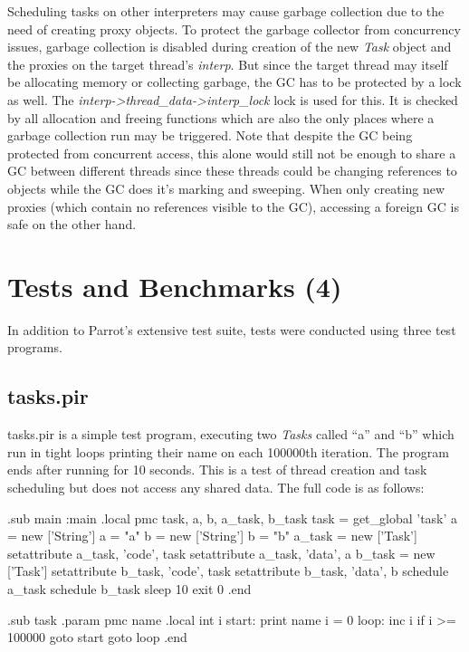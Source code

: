 \documentclass[bachelor,english]{hgbthesis}
\begin{document}
Scheduling tasks on other interpreters may cause garbage collection due to the need of creating proxy objects. To protect the garbage collector from concurrency issues, garbage collection is disabled during creation of the new \textit{Task} object and the proxies on the target thread's \textit{interp}. But since the target thread may itself be allocating memory or collecting garbage, the GC has to be protected by a lock as well. The \textit{interp->thread\_data->interp\_lock} lock is used for this. It is checked by all allocation and freeing functions which are also the only places where a garbage collection run may be triggered. Note that despite the GC being protected from concurrent access, this alone would still not be enough to share a GC between different threads since these threads could be changing references to objects while the GC does it's marking and sweeping. When only creating new proxies (which contain no references visible to the GC), accessing a foreign GC is safe on the other hand.

\chapter{Tests and Benchmarks (4)}

In addition to Parrot's extensive test suite, tests were conducted using three test programs.

\section{tasks.pir}

tasks.pir is a simple test program, executing two \textit{Tasks} called ``a'' and ``b'' which run in tight loops printing their name on each 100000th iteration. The program ends after running for 10 seconds. This is a test of thread creation and task scheduling but does not access any shared data. The full code is as follows:
%
\begin{GenericCode}
.sub main :main
    .local pmc task, a, b, a_task, b_task
    task = get_global 'task'
    a = new ['String']
    a = "a"
    b = new ['String']
    b = "b"
    a_task = new ['Task']
    setattribute a_task, 'code', task
    setattribute a_task, 'data', a
    b_task = new ['Task']
    setattribute b_task, 'code', task
    setattribute b_task, 'data', b
    schedule a_task
    schedule b_task
    sleep 10
    exit 0
.end

.sub task
    .param pmc name
    .local int i
start:
    print name
    i = 0
loop:
    inc i
    if i >= 100000 goto start
    goto loop
.end
\end{GenericCode}
\end{document}

